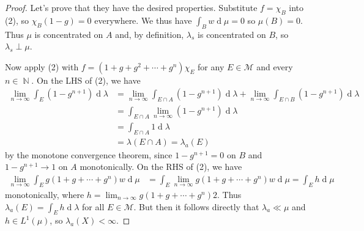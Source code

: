 \documentclass[12pt, a4paper]{book}
\DeclareMathOperator{\N}{\mathbb{N}}
\renewcommand{\d}[1]{\ensuremath{\operatorname{d}\!{#1}}} %
\theoremstyle{nonumberplain}
\newtheorem{proof}{Proof}
\begin{document}
\begin{proof}
    Let's prove that they have the desired properties.
    Substitute $f=\chi_B$ into (2), so $\chi_B(1-g)=0$ everywhere.
    We thus have $\int_B w\d{\mu}=0$ so $\mu(B)=0$.
    Thus $\mu$ is concentrated on $A$ and, by definition, $\lambda_s$ is concentrated on $B$, so $\lambda_s\perp\mu$.

    Now apply (2) with $f=(1+g+g^2+\cdots+g^n)\chi_E$ for any $E\in\mathcal{M}$ and every $n\in\N$.
    On the LHS of (2), we have
    \begin{align*}
        \lim_{n\to\infty}\int_E(1-g^{n+1})\d{\lambda} &= \lim_{n\to\infty}\int_{E\cap A}(1-g^{n+1})\d{\lambda}+\lim_{n\to\infty}\int_{E\cap B}(1-g^{n+1})\d{\lambda}\\
                                                      &= \int_{E\cap A}\lim_{n\to\infty}(1-g^{n+1})\d{\lambda}\\
                                                      &=\int_{E\cap A}1\d{\lambda}\\
                                                      &=\lambda(E\cap A)=\lambda_a(E)
    \end{align*}
    by the monotone convergence theorem, since $1-g^{n+1}=0$ on $B$ and $1-g^{n+1}\to 1$ on $A$ monotonically.
    On the RHS of (2), we have
    \begin{align*}
        \lim_{n\to\infty} \int_Eg(1+g+\cdots+g^n)w\d{\mu} &= \int_E \lim_{n\to\infty} g(1+g+\cdots+g^n)w\d{\mu}=\int_E h\d{\mu}
    \end{align*}
    monotonically, where $h=\lim_{n\to\infty}g(1+g+\cdots+g^n)2$.
    Thus $\lambda_a(E)=\int_E h\d{\lambda}$ for all $E\in\mathcal{M}$.
    But then it follows directly that $\lambda_a\ll\mu$ and $h\in L^1(\mu)$, so $\lambda_a(X)<\infty$.
\end{proof}
\end{document}
